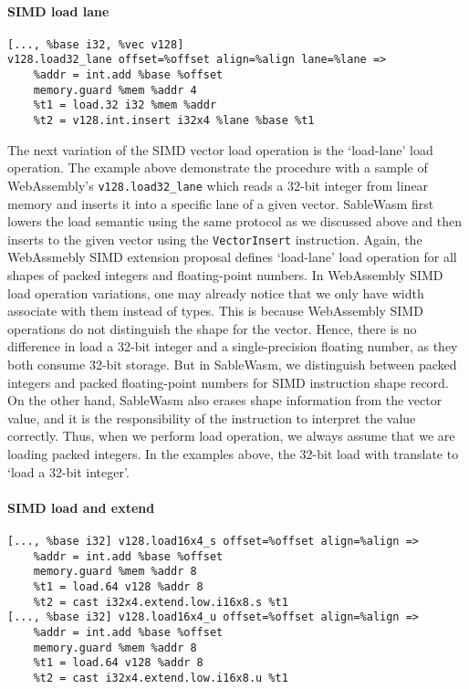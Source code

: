 \paragraph{SIMD load lane} \quad
\begin{lstlisting}[basicstyle=\linespread{0.8}\small, language=SableWasmMIR]
[..., %base i32, %vec v128]
v128.load32_lane offset=%offset align=%align lane=%lane =>
    %addr = int.add %base %offset
    memory.guard %mem %addr 4
    %t1 = load.32 i32 %mem %addr
    %t2 = v128.int.insert i32x4 %lane %base %t1
\end{lstlisting}
The next variation of the SIMD vector load operation is the `load-lane' load operation. The example above demonstrate the procedure with a sample of WebAssembly's \texttt{v128.load32\_lane}  which reads a 32-bit integer from linear memory and inserts it into a specific lane of a given vector. SableWasm first lowers the load semantic using the same protocol as we discussed above and then inserts to the given vector using the \texttt{VectorInsert} instruction. Again, the WebAssmebly SIMD extension proposal defines `load-lane' load operation for all shapes of packed integers and floating-point numbers. In WebAssembly SIMD load operation variations, one may already notice that we only have width associate with them instead of types. This is because WebAssembly SIMD operations do not distinguish the shape for the vector. Hence, there is no difference in load a 32-bit integer and a single-precision floating number, as they both consume 32-bit storage. But in SableWasm, we distinguish between packed integers and packed floating-point numbers for SIMD instruction shape record.  On the other hand, SableWasm also erases shape information from the vector value, and it is the responsibility of the instruction to interpret the value correctly. Thus, when we perform load operation, we always assume that we are loading packed integers. In the examples above, the 32-bit load with translate to `load a 32-bit integer'.

\paragraph{SIMD load and extend} \quad
\begin{lstlisting}[basicstyle=\linespread{0.8}\small, language=SableWasmMIR]
[..., %base i32] v128.load16x4_s offset=%offset align=%align =>
    %addr = int.add %base %offset
    memory.guard %mem %addr 8
    %t1 = load.64 v128 %addr 8
    %t2 = cast i32x4.extend.low.i16x8.s %t1
[..., %base i32] v128.load16x4_u offset=%offset align=%align =>
    %addr = int.add %base %offset
    memory.guard %mem %addr 8
    %t1 = load.64 v128 %addr 8
    %t2 = cast i32x4.extend.low.i16x8.u %t1
\end{lstlisting}
